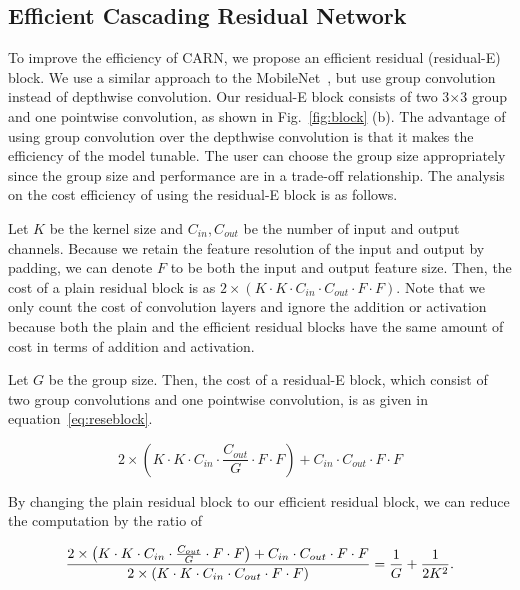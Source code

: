 \documentclass[runningheads]{llncs}
\begin{document}
\subsection{Efficient Cascading Residual Network}
\label{subsec:carn-m}
To improve the efficiency of CARN, we propose an efficient residual (residual-E) block. We use a similar approach to the MobileNet~\cite{mobilenets}, but use group convolution instead of depthwise convolution. Our residual-E block consists of two 3$\times$3 group and one pointwise convolution, as shown in Fig.~\ref{fig:block} (b). The advantage of using group convolution over the depthwise convolution is that it makes the efficiency of the model tunable. The user can choose the group size appropriately since the group size and performance are in a trade-off relationship. The analysis on the cost efficiency of using the residual-E block is as follows.

Let $K$ be the kernel size and $C_{in}, C_{out}$ be the number of input and output channels. Because we retain the feature resolution of the input and output by padding, we can denote $F$ to be both the input and output feature size. Then, the cost of a plain residual block is as $2\times\left(K \cdot K \cdot C_{in} \cdot C_{out} \cdot F \cdot F\right)$. Note that we only count the cost of convolution layers and ignore the addition or activation because both the plain and the efficient residual blocks have the same amount of cost in terms of addition and activation.

Let $G$ be the group size. Then, the cost of a residual-E block, which consist of two group convolutions and one pointwise convolution, is as given in equation~\ref{eq:reseblock}.

\begin{equation} \label{eq:reseblock}
2\times\left(K \cdot K \cdot C_{in} \cdot \frac{C_{out}}{G} \cdot F \cdot F\right) + C_{in} \cdot C_{out} \cdot F \cdot F
\end{equation}

By changing the plain residual block to our efficient residual block, we can reduce the computation by the ratio of

\begin{equation}
\frac{2\times\left(K \cdot K \cdot C_{in} \cdot \frac{C_{out}}{G} \cdot F \cdot F\right) + C_{in} \cdot C_{out} \cdot F \cdot F}{2\times\left(K \cdot K \cdot C_{in} \cdot C_{out} \cdot F \cdot F\right)} \\
= \frac{1}{G} + \frac{1}{2K^2}.
\end{equation}
\end{document}
